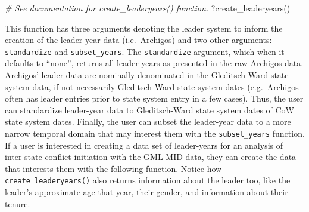 \documentclass[
  11pt,
]{article}
\newenvironment{Shaded}{\begin{snugshade}}{\end{snugshade}}
\newcommand{\CommentTok}[1]{\textcolor[rgb]{0.56,0.35,0.01}{\textit{#1}}}
\newcommand{\FunctionTok}[1]{\textcolor[rgb]{0.00,0.00,0.00}{#1}}
\newcommand{\NormalTok}[1]{#1}
\begin{document}
\begin{Shaded}
\begin{Highlighting}[]
\CommentTok{\# See documentation for create\_leaderyears() function.}
\NormalTok{?}\FunctionTok{create\_leaderyears}\NormalTok{()}
\end{Highlighting}
\end{Shaded}

This function has three arguments denoting the leader system to inform the creation of the leader-year data (i.e.~Archigos) and two other arguments: \texttt{standardize} and \texttt{subset\_years}. The \texttt{standardize} argument, which when it defaults to ``none'', returns all leader-years as presented in the raw Archigos data. Archigos' leader data are nominally denominated in the Gleditsch-Ward state system data, if not necessarily Gleditsch-Ward state system dates (e.g.~Archigos often has leader entries prior to state system entry in a few cases). Thus, the user can standardize leader-year data to Gleditsch-Ward state system dates of CoW state system dates. Finally, the user can subset the leader-year data to a more narrow temporal domain that may interest them with the \texttt{subset\_years} function. If a user is interested in creating a data set of leader-years for an analysis of inter-state conflict initiation with the GML MID data, they can create the data that interests them with the following function. Notice how \texttt{create\_leaderyears()} also returns information about the leader too, like the leader's approximate age that year, their gender, and information about their tenure.
\end{document}
